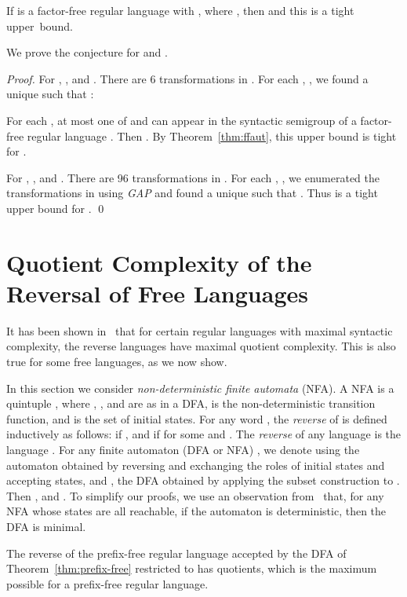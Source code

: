 \documentclass{llncs}
\begin{document}
\begin{conjecture}\label{con:ff}
If  is a factor-free regular language with , where , then  and this is a tight upper~bound. 
\end{conjecture}

We prove the conjecture for  and . 

\begin{proof} 
For , , and . There are 6 transformations  in . For each , , we found a unique  such that : 
 

For each , at most one of  and  can appear in the syntactic semigroup  of a factor-free regular language . Then . By Theorem~\ref{thm:ffaut}, this upper bound is tight for . 

For , , and . There are 96 transformations  in . For each , , we enumerated the transformations in  using \emph{GAP} and found a unique  such that . Thus  is a tight upper bound for . \qed
\end{proof}



\section{Quotient Complexity of the Reversal of Free Languages}\label{sec:rev}

It has been shown in~\cite{BrYe11} that for certain regular languages with maximal syntactic complexity, the reverse languages have maximal quotient complexity. This is also true for some free languages, as we now show. 

In this section we consider \emph{non-deterministic finite automata} (NFA). A NFA  is a quintuple , where , , and  are as in a DFA,  is the non-deterministic transition function, and  is the set of initial states. For any word , the \emph{reverse} of  is defined inductively as follows:  if , and  if  for some  and . The \emph{reverse} of any language  is the language . For any finite automaton (DFA or NFA) , we denote using  the automaton obtained by reversing  and exchanging the roles of initial states and accepting states, and , the DFA obtained by applying the subset construction to . Then , and . To simplify our proofs, we use an observation from~\cite{Brz62} that, for any NFA  whose states are all reachable, if the automaton  is deterministic, then the DFA  is minimal. 

\begin{theorem}\label{thm:pfrev}
The reverse of the prefix-free regular language accepted by 
the DFA  of Theorem~\ref{thm:prefix-free} restricted to 
has  quotients, which is the maximum possible for a prefix-free regular language. 
\end{theorem}
\end{document}
